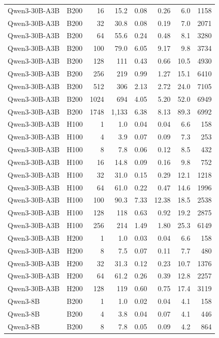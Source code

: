 \begin{longtable}{llrrrrrr}
Qwen3-30B-A3B & B200 & 16 & 15.2 & 0.08 & 0.26 & 6.0 & 1158 \\
Qwen3-30B-A3B & B200 & 32 & 30.8 & 0.08 & 0.19 & 7.0 & 2071 \\
Qwen3-30B-A3B & B200 & 64 & 55.6 & 0.24 & 0.48 & 8.1 & 3280 \\
Qwen3-30B-A3B & B200 & 100 & 79.0 & 6.05 & 9.17 & 9.8 & 3734 \\
Qwen3-30B-A3B & B200 & 128 & 111 & 0.43 & 0.66 & 10.5 & 4930 \\
Qwen3-30B-A3B & B200 & 256 & 219 & 0.99 & 1.27 & 15.1 & 6410 \\
Qwen3-30B-A3B & B200 & 512 & 306 & 2.13 & 2.72 & 24.0 & 7105 \\
Qwen3-30B-A3B & B200 & 1024 & 694 & 4.05 & 5.20 & 52.0 & 6949 \\
Qwen3-30B-A3B & B200 & 1748 & 1,133 & 6.38 & 8.13 & 89.3 & 6992 \\
Qwen3-30B-A3B & H100 & 1 & 1.0 & 0.04 & 0.04 & 6.6 & 158 \\
Qwen3-30B-A3B & H100 & 4 & 3.9 & 0.07 & 0.09 & 7.3 & 253 \\
Qwen3-30B-A3B & H100 & 8 & 7.8 & 0.06 & 0.12 & 8.5 & 432 \\
Qwen3-30B-A3B & H100 & 16 & 14.8 & 0.09 & 0.16 & 9.8 & 752 \\
Qwen3-30B-A3B & H100 & 32 & 31.0 & 0.15 & 0.29 & 12.1 & 1218 \\
Qwen3-30B-A3B & H100 & 64 & 61.0 & 0.22 & 0.47 & 14.6 & 1996 \\
Qwen3-30B-A3B & H100 & 100 & 90.3 & 7.33 & 12.38 & 18.5 & 2538 \\
Qwen3-30B-A3B & H100 & 128 & 118 & 0.63 & 0.92 & 19.2 & 2875 \\
Qwen3-30B-A3B & H100 & 256 & 214 & 1.49 & 1.80 & 25.3 & 6149 \\
Qwen3-30B-A3B & H200 & 1 & 1.0 & 0.03 & 0.04 & 6.6 & 158 \\
Qwen3-30B-A3B & H200 & 8 & 7.5 & 0.07 & 0.11 & 7.7 & 480 \\
Qwen3-30B-A3B & H200 & 32 & 31.3 & 0.12 & 0.23 & 10.7 & 1376 \\
Qwen3-30B-A3B & H200 & 64 & 61.2 & 0.26 & 0.39 & 12.8 & 2257 \\
Qwen3-30B-A3B & H200 & 128 & 119 & 0.60 & 0.75 & 17.4 & 3119 \\
Qwen3-8B & B200 & 1 & 1.0 & 0.02 & 0.04 & 4.1 & 158 \\
Qwen3-8B & B200 & 4 & 3.8 & 0.04 & 0.07 & 4.1 & 446 \\
Qwen3-8B & B200 & 8 & 7.8 & 0.05 & 0.09 & 4.2 & 864 \\

\end{longtable}
